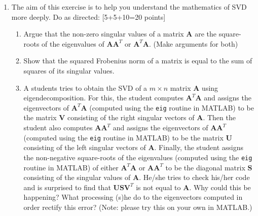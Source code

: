\documentclass[11pt]{article}
\begin{document}
\begin{enumerate}
\item The aim of this exercise is to help you understand the mathematics of SVD more deeply. Do as directed: \textsf{[5+5+10=20 points]}
\begin{enumerate}
\item Argue that the non-zero singular values of a matrix $\boldsymbol{A}$ are the square-roots of the eigenvalues of $\boldsymbol{AA}^T$ or $\boldsymbol{A}^T\boldsymbol{A}$. (Make arguments for both)
\item Show that the squared Frobenius norm of a matrix is equal to the sum of squares of its singular values.
\item A students tries to obtain the SVD of a $m \times n$ matrix $\boldsymbol{A}$ using eigendecomposition. For this, the student computes $\boldsymbol{A}^T \boldsymbol{A}$ and assigns the eigenvectors of $\boldsymbol{A}^T \boldsymbol{A}$ (computed using the \texttt{eig} routine in MATLAB) to be the matrix $\boldsymbol{V}$ consisting of the right singular vectors of $\boldsymbol{A}$. Then the student also computes $\boldsymbol{A} \boldsymbol{A}^T$ and assigns the eigenvectors of $\boldsymbol{A}\boldsymbol{A}^T$ (computed using the \texttt{eig} routine in MATLAB) to be the matrix $\boldsymbol{U}$ consisting of the left singular vectors of $\boldsymbol{A}$. Finally, the student assigns the non-negative square-roots of the eigenvalues (computed using the \texttt{eig} routine in MATLAB) of either $\boldsymbol{A}^T \boldsymbol{A}$ or $\boldsymbol{A} \boldsymbol{A}^T$ to be the diagonal matrix $\boldsymbol{S}$ consisting of the singular values of $\boldsymbol{A}$. He/she tries to check his/her code and is surprised to find that $\boldsymbol{USV}^T$ is not equal to $\boldsymbol{A}$. Why could this be happening? What processing (s)he do to the eigenvectors computed in order rectify this error? (Note: please try this on your own in MATLAB.)
\end{enumerate}

\end{enumerate}
\end{document}
